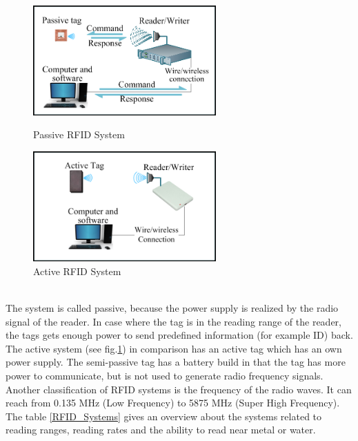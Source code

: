 \begin{figure}[!htbp]
\centering
\begin{minipage}{.5\textwidth}
\centering
\includegraphics[width = 7cm]{Pictures/RFID_Passive}%
\caption{Passive RFID System}
\label{RFID_Passive}
\end{minipage}%
\begin{minipage}{.5\textwidth}
\centering
\includegraphics[width = 7cm]{Pictures/RFID_Active}%
\caption{Active RFID System}
\label{RFID_Active}
\end{minipage}
\end{figure}\\
The system is called passive, because the power supply is realized by the radio signal of the reader. In case where the tag is in the reading range of the reader, the tags gets enough power to send predefined information (for example ID) back. The active system (see fig.\ref{RFID_Active}) in comparison has an active tag which has an own power supply. The semi-passive tag has a battery build in that the tag has more power to communicate, but is not used to generate radio frequency signals.\\ 
Another classification of RFID systems is the frequency of the radio waves. It can reach from 0.135 MHz (Low Frequency) to 5875 MHz (Super High Frequency). The table \ref{RFID_Systems} gives an overview about the systems related to reading ranges, reading rates and the ability to read near metal or water.\\
